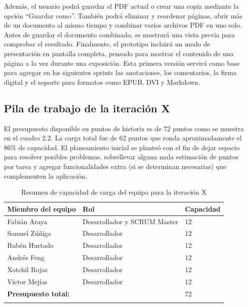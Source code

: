 Además, el usuario podrá guardar el PDF actual o crear una copia mediante la opción “Guardar como”. También podrá eliminar y reordenar páginas, abrir más de un documento al mismo tiempo y combinar varios archivos PDF en uno solo. Antes de guardar el documento combinado, se mostrará una vista previa para comprobar el resultado. Finalmente, el prototipo incluirá un modo de presentación en pantalla completa, pensado para mostrar el contenido de una página a la vez durante una exposición. Esta primera versión servirá como base para agregar en los siguientes sprints las anotaciones, los comentarios, la firma digital y el soporte para formatos como EPUB, DVI y Markdown.

\subsection{Pila de trabajo de la iteración X}

El presupuesto disponible en puntos de historia es de 72 puntos como se muestra en el cuadro 2.2. La carga total fue de 62 puntos que ronda aproximadamente el 86\% de capacidad. El planeamiento inicial se planteó con el fin de dejar espacio para resolver posibles problemas, sobrellevar alguna mala estimación de puntos por tarea y agregar funcionalidades extra (si se determinan necesarias) que complementen la aplicación. 

\begin{longtable}{|l|l|l|}
    \hline
    \textbf{Miembro del equipo} & \textbf{Rol} & \textbf{Capacidad} \\
    \hline
    Fabián Araya & Desarrollador y SCRUM Master & 12 \\
    Samuel Zúñiga & Desarrollador & 12 \\
    Rubén Hurtado & Desarrollador & 12\\
    Andrés Feng & Desarrollador & 12\\
    Xotchil Rojas & Desarrollador & 12\\
    Víctor Mejías & Desarrollador & 12 \\
    \hline \hline
    \textbf{Presupuesto total:} &  & 72\\
    \hline
    \caption{Resumen de capacidad de carga del equipo para la iteración X}
\end{longtable}


